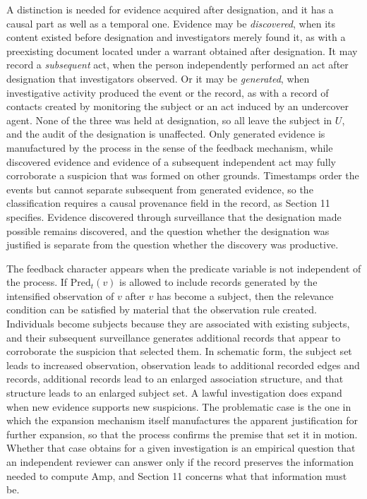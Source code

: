 \documentclass[11pt]{article}
\theoremstyle{definition}
\theoremstyle{remark}
\begin{document}
A distinction is needed for evidence acquired after designation, and it has a causal part as well as a temporal one. Evidence may be \emph{discovered}, when its content existed before designation and investigators merely found it, as with a preexisting document located under a warrant obtained after designation. It may record a \emph{subsequent} act, when the person independently performed an act after designation that investigators observed. Or it may be \emph{generated}, when investigative activity produced the event or the record, as with a record of contacts created by monitoring the subject or an act induced by an undercover agent. None of the three was held at designation, so all leave the subject in $U$, and the audit of the designation is unaffected. Only generated evidence is manufactured by the process in the sense of the feedback mechanism, while discovered evidence and evidence of a subsequent independent act may fully corroborate a suspicion that was formed on other grounds. Timestamps order the events but cannot separate subsequent from generated evidence, so the classification requires a causal provenance field in the record, as Section 11 specifies. Evidence discovered through surveillance that the designation made possible remains discovered, and the question whether the designation was justified is separate from the question whether the discovery was productive.

The feedback character appears when the predicate variable is not independent of the process. If $\mathrm{Pred}_t(v)$ is allowed to include records generated by the intensified observation of $v$ after $v$ has become a subject, then the relevance condition can be satisfied by material that the observation rule created. Individuals become subjects because they are associated with existing subjects, and their subsequent surveillance generates additional records that appear to corroborate the suspicion that selected them. In schematic form, the subject set leads to increased observation, observation leads to additional recorded edges and records, additional records lead to an enlarged association structure, and that structure leads to an enlarged subject set. A lawful investigation does expand when new evidence supports new suspicions. The problematic case is the one in which the expansion mechanism itself manufactures the apparent justification for further expansion, so that the process confirms the premise that set it in motion. Whether that case obtains for a given investigation is an empirical question that an independent reviewer can answer only if the record preserves the information needed to compute $\mathrm{Amp}$, and Section 11 concerns what that information must be.
\end{document}
